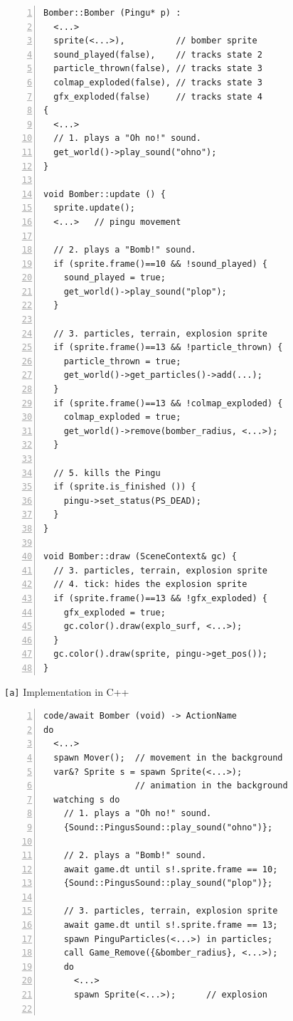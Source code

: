 \documentclass{vgtc}                          %
\newcommand{\code}[1] {{\small{\texttt{#1}}}}
\newcommand{\ax}{\code{[a]}\xspace}
\begin{document}
\begin{figure}[th!]
\begin{minipage}[t]{0.50\linewidth}
\begin{lstlisting}[numbers=left,xleftmargin=3em]
Bomber::Bomber (Pingu* p) :
  <...>
  sprite(<...>),          // bomber sprite
  sound_played(false),    // tracks state 2
  particle_thrown(false), // tracks state 3
  colmap_exploded(false), // tracks state 3
  gfx_exploded(false)     // tracks state 4
{
  <...>
  // 1. plays a "Oh no!" sound.
  get_world()->play_sound("ohno");
}

void Bomber::update () {
  sprite.update();
  <...>   // pingu movement

  // 2. plays a "Bomb!" sound.
  if (sprite.frame()==10 && !sound_played) {
    sound_played = true;
    get_world()->play_sound("plop");
  }

  // 3. particles, terrain, explosion sprite
  if (sprite.frame()==13 && !particle_thrown) {
    particle_thrown = true;
    get_world()->get_particles()->add(...);
  }
  if (sprite.frame()==13 && !colmap_exploded) {
    colmap_exploded = true;
    get_world()->remove(bomber_radius, <...>);
  }

  // 5. kills the Pingu
  if (sprite.is_finished ()) {
    pingu->set_status(PS_DEAD);
  }
}

void Bomber::draw (SceneContext& gc) {
  // 3. particles, terrain, explosion sprite
  // 4. tick: hides the explosion sprite
  if (sprite.frame()==13 && !gfx_exploded) {
    gfx_exploded = true;
    gc.color().draw(explo_surf, <...>);
  }
  gc.color().draw(sprite, pingu->get_pos());
}
\end{lstlisting}
\centering\small{\ax Implementation in C++}
\end{minipage}
%
\begin{minipage}[t]{0.50\linewidth}
\begin{lstlisting}[numbers=left,xleftmargin=3em]
code/await Bomber (void) -> ActionName
do
  <...>
  spawn Mover();  // movement in the background
  var&? Sprite s = spawn Sprite(<...>);
                  // animation in the background
  watching s do
    // 1. plays a "Oh no!" sound.
    {Sound::PingusSound::play_sound("ohno")};

    // 2. plays a "Bomb!" sound.
    await game.dt until s!.sprite.frame == 10;
    {Sound::PingusSound::play_sound("plop")};

    // 3. particles, terrain, explosion sprite
    await game.dt until s!.sprite.frame == 13;
    spawn PinguParticles(<...>) in particles;
    call Game_Remove({&bomber_radius}, <...>);
    do
      <...>
      spawn Sprite(<...>);      // explosion


\end{lstlisting}
\end{minipage}
\end{figure}
\end{document}
